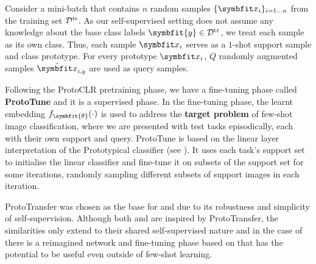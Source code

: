 \begin{tcolorbox}[title=Link between self-supervision and an episode]
Consider a mini-batch that contains $n$ random samples $\{{\bfitx_i}\}_{i=1 \ldots n}$ from the training set $\mathcal{D}^\textup{tr}$.
As our self-supervised setting does not assume any knowledge about the base class labels $\symbfit{y} \in \mathcal{D}^\textup{tr}$, we treat each sample as its own class. Thus, each sample $\bfitx_i$ serves as a $1$-shot support sample and class prototype. For every prototype $\bfitx_i$, $Q$ randomly augmented samples $\Tilde{\bfitx}_{i,q}$ are used as query samples.
\end{tcolorbox}

Following the ProtoCLR pretraining phase, we have a fine-tuning phase called \textbf{ProtoTune} and it is a supervised phase. In the fine-tuning phase, the learnt embedding $f_{\symbfit{\theta}}(\cdot)$ is used to address the \textbf{target problem} of few-shot image classification, where we are presented with test tasks episodically, each with their own support and query.
ProtoTune is based on the linear layer interpretation of the Prototypical classifier (see ). It uses each task's support set to initialise the linear classifier and fine-tune it on subsets of the support set for some iterations, randomly sampling different subsets of support images in each iteration.

ProtoTransfer was chosen as the base for \ccclr{} and \samptr{} due to its robustness and simplicity of self-supervision. Although both \ccclr{} and \samptr{} are inspired by ProtoTransfer, the similarities only extend to their shared self-supervised nature and in the case of \samptr{} there is a reimagined network and fine-tuning phase based on  that has the potential to be useful even outside of few-shot learning.